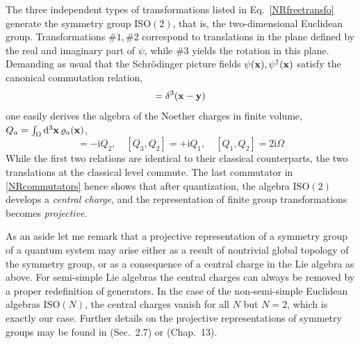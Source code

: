 \documentclass[final,2p,times,12pt,sort&compress]{elsarticle}
\newcommand\gr[1]{\mathrm{#1}}              %
\newcommand\vek[1]{{\boldsymbol{\bf #1}}}   %
\newcommand\he[1]{#1^{\dagger}}             %
\newcommand\imag{\mathrm i}                 %
\newcommand\vr{\varrho}
\newcommand\dthree{\mathop{{\rm d}^3\!}\nolimits} %
\begin{document}
The three independent types of transformations listed in
Eq.~\eqref{NRfreetransfo} generate the symmetry group $\gr{ISO(2)}$, that is,
the two-dimensional Euclidean group. Transformations $\#1,\#2$ correspond to
translations in the plane defined by the real and imaginary part of $\psi$,
while $\#3$ yields the rotation in this plane. Demanding as usual that the
Schr\"odinger picture fields $\psi(\vek x),\he\psi(\vek x)$ satisfy the
canonical commutation relation,
\begin{equation}
[\psi(\vek x),\he\psi(\vek y)]=\delta^3(\vek x-\vek y)
\label{NRCCR}
\end{equation}
one easily derives the algebra of the Noether charges in finite
volume, $Q_a=\int_\Omega\dthree\vek x\,\vr_a(\vek x)$,
\begin{equation}
[Q_3,Q_1]=-\imag Q_2,\quad
[Q_3,Q_2]=+\imag Q_1,\quad
[Q_1,Q_2]=2\imag\Omega
\label{NRcommutators}
\end{equation}
While the first two relations are identical to their classical counterparts,
the two translations at the classical level commute. The last commutator in
\eqref{NRcommutators} hence shows that after quantization, the algebra
$\gr{ISO(2)}$ develops a \emph{central charge}, and the representation of
finite group transformations becomes \emph{projective}.

As an aside let me remark that a projective representation of a symmetry group
of a quantum system may arise either as a result of nontrivial global topology
of the symmetry group, or as a consequence of a central charge in the Lie
algebra as above. For semi-simple Lie algebras the central charges can always be
removed by a proper redefinition of generators. In the case of the
non-semi-simple Euclidean algebras $\gr{ISO}(N)$, the central charges vanish for
all $N$ but $N=2$, which is exactly our case. Further details on the projective
representations of symmetry groups may be found in
\cite{Weinberg:1995v1} (Sec.~2.7) or \cite{Barut:1977ba} (Chap.~13).
\end{document}
